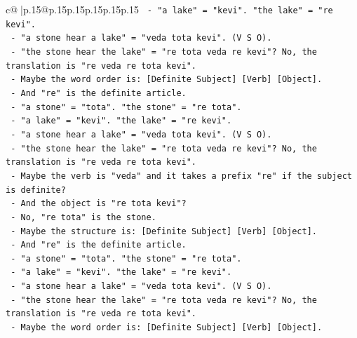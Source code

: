 \documentclass{article}
\begin{document}
{\begin{supertabular}{c@{$\;$}|p{.15\linewidth}@{}p{.15\linewidth}p{.15\linewidth}p{.15\linewidth}p{.15\linewidth}p{.15\linewidth}}
{{{\texttt{                           {-} "a lake" = "kevi". "the lake" = "re kevi".} \\
\texttt{                           {-} "a stone hear a lake" = "veda tota kevi". (V S O).} \\
\texttt{                           {-} "the stone hear the lake" = "re tota veda re kevi"? No, the translation is "re veda re tota kevi".} \\
\texttt{                           {-} Maybe the word order is: {[}Definite Subject{]} {[}Verb{]} {[}Object{]}.} \\
\texttt{                           {-} And "re" is the definite article.} \\
\texttt{                           {-} "a stone" = "tota". "the stone" = "re tota".} \\
\texttt{                           {-} "a lake" = "kevi". "the lake" = "re kevi".} \\
\texttt{                           {-} "a stone hear a lake" = "veda tota kevi". (V S O).} \\
\texttt{                           {-} "the stone hear the lake" = "re tota veda re kevi"? No, the translation is "re veda re tota kevi".} \\
\texttt{                           {-} Maybe the verb is "veda" and it takes a prefix "re" if the subject is definite?} \\
\texttt{                           {-} And the object is "re tota kevi"?} \\
\texttt{                           {-} No, "re tota" is the stone.} \\
\texttt{                           {-} Maybe the structure is: {[}Definite Subject{]} {[}Verb{]} {[}Object{]}.} \\
\texttt{                           {-} And "re" is the definite article.} \\
\texttt{                           {-} "a stone" = "tota". "the stone" = "re tota".} \\
\texttt{                           {-} "a lake" = "kevi". "the lake" = "re kevi".} \\
\texttt{                           {-} "a stone hear a lake" = "veda tota kevi". (V S O).} \\
\texttt{                           {-} "the stone hear the lake" = "re tota veda re kevi"? No, the translation is "re veda re tota kevi".} \\
\texttt{                           {-} Maybe the word order is: {[}Definite Subject{]} {[}Verb{]} {[}Object{]}.} \\
}}}
\end{supertabular}}
\end{document}
